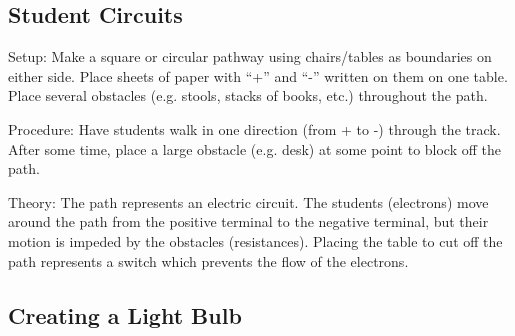 \begin{multicols}{2}
\subsection{Student Circuits}


\begin{description*}
\item[Setup:]{Make a square or circular pathway using chairs/tables as boundaries on either side. Place sheets of paper with ``+'' and ``-'' written on them on one table. Place several obstacles (e.g. stools, stacks of books, etc.) throughout the path.}
\item[Procedure:]{Have students walk in one direction (from + to -) through the track. After some time, place a large obstacle (e.g. desk) at some point to block off the path.}
\item[Theory:]{The path represents an electric circuit. The students (electrons) move around the path from the positive terminal to the negative terminal, but their motion is impeded by the obstacles (resistances). Placing the table to cut off the path represents a switch which prevents the flow of the electrons.}
\end{description*}

\columnbreak

\subsection{Creating a Light Bulb}



\end{multicols}
